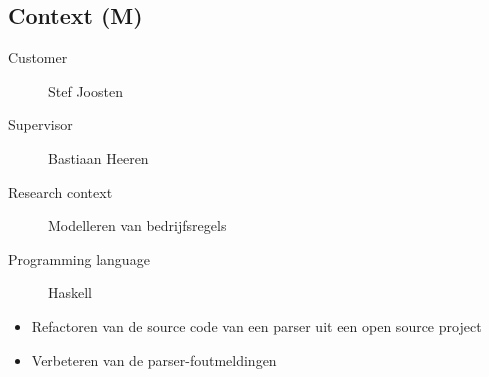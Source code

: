 
\subsection{Context (M)}
%
\begin{description}
	\item [Customer] Stef Joosten
	\item [Supervisor] Bastiaan Heeren
	\item [Research context] Modelleren van bedrijfsregels
	\item [Programming language] Haskell
\end{description}

\begin{itemize}
	\item Refactoren van de source code van een parser uit een open source project 
	\item Verbeteren van de parser-foutmeldingen
\end{itemize}
